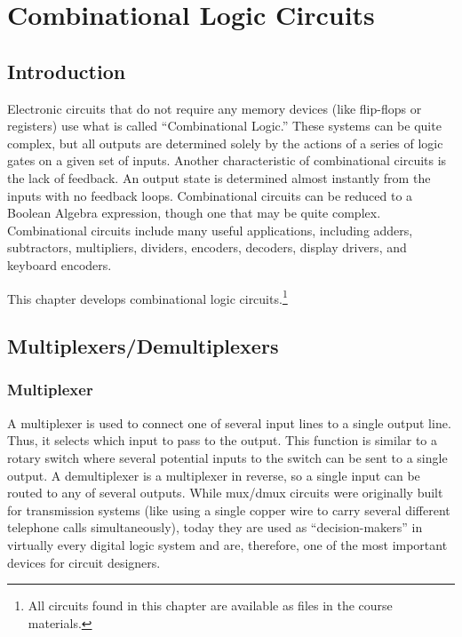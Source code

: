 \chapter{Combinational Logic Circuits}\label{ch08a}
\section{Introduction}

Electronic circuits that do not require any memory devices (like flip-flops or registers) use what is called ``Combinational Logic.'' These systems can be quite complex, but all outputs are determined solely by the actions of a series of logic gates on a given set of inputs. Another characteristic of combinational circuits is the lack of feedback. An output state is determined almost instantly from the inputs with no feedback loops. Combinational circuits can be reduced to a Boolean Algebra expression, though one that may be quite complex. Combinational circuits include many useful applications, including adders, subtractors, multipliers, dividers, encoders, decoders, display drivers, and keyboard encoders.
 
This chapter develops combinational logic circuits.\footnote{All circuits found in this chapter are available as \Le files in the course materials.}

\section{Multiplexers/Demultiplexers}
\label{CL:sec:multiplexers_demultiplexers}

\subsection{Multiplexer}
\label{CL:subsec:multiplexer}


A multiplexer is used to connect one of several input lines to a single output line. Thus, it selects which input to pass to the output. This function is similar to a rotary switch where several potential inputs to the switch can be sent to a single output. A demultiplexer is a multiplexer in reverse, so a single input can be routed to any of several outputs. While mux/dmux circuits were originally built for transmission systems (like using a single copper wire to carry several different telephone calls simultaneously), today they are used as ``decision-makers'' in virtually every digital logic system and are, therefore, one of the most important devices for circuit designers. 

